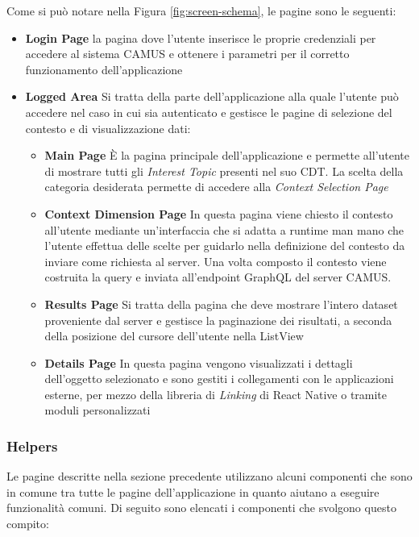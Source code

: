 Come si può notare nella Figura \ref{fig:screen-schema}, le pagine sono le seguenti:

\begin{itemize}
	\item \textbf{Login Page}
	\upe la pagina dove l'utente inserisce le proprie credenziali per accedere al sistema CAMUS e ottenere i parametri per il corretto funzionamento dell'applicazione
	\item \textbf{Logged Area}
	Si tratta della parte dell'applicazione alla quale l'utente può accedere nel caso in cui sia autenticato e gestisce le pagine di selezione del contesto e di visualizzazione dati:
	\begin{itemize}
		\item \textbf{Main Page}
		È la pagina principale dell'applicazione e permette all'utente di mostrare tutti gli \emph{Interest Topic} presenti nel suo CDT. La scelta della categoria desiderata permette di accedere alla \emph{Context Selection Page}
		\item \textbf{Context Dimension Page}
		In questa pagina viene chiesto il contesto all'utente mediante un'interfaccia che si adatta a runtime man mano che l'utente effettua delle scelte per guidarlo nella definizione del contesto da inviare come richiesta al server. Una volta composto il contesto viene costruita la query e inviata all'endpoint GraphQL del server CAMUS. 
		\item \textbf{Results Page}
		Si tratta della pagina che deve mostrare l'intero dataset proveniente dal server e gestisce la paginazione dei risultati, a seconda della posizione del cursore dell'utente nella ListView 
		\item \textbf{Details Page}
		In questa pagina vengono visualizzati i dettagli dell'oggetto selezionato e sono gestiti i collegamenti con le applicazioni esterne, per mezzo della libreria di \emph{Linking} di React Native o tramite moduli personalizzati
	\end{itemize}
\end{itemize}

\subsubsection{Helpers}

Le pagine descritte nella sezione precedente utilizzano alcuni componenti che sono in comune tra tutte le pagine dell'applicazione in quanto aiutano a eseguire funzionalità comuni. Di seguito sono elencati i componenti che svolgono questo compito:

